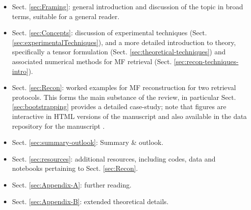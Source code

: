 \begin{itemize}
\item Sect. \ref{sec:Framing}: general introduction and discussion of the topic in broad terms, suitable for a general reader.
\item Sect. \ref{sec:Concepts}: discussion of experimental techniques (Sect. \ref{sec:experimentalTechniques}), and a more detailed introduction to theory, specifically a tensor formulation  (Sect. \ref{sec:theoretical-techniques}) and associated numerical methods for MF retrieval (Sect. \ref{sec:recon-techniques-intro}).
\item Sect. \ref{sec:Recon}: worked examples for MF reconstruction for two retrieval protocols. This forms the main substance of the review, in particular Sect. \ref{sec:bootstrapping} provides a detailed case-study; note that figures are interactive in HTML versions of the manuscript and also available in the data repository for the manuscript \cite{hockett2022MFreconFigshare}.
\item Sect. \ref{sec:summary-outlook}: Summary \& outlook.
\item Sect. \ref{sec:resources}: additional resources, including codes, data and notebooks pertaining to Sect. \ref{sec:Recon}.
\item Sect. \ref{sec:Appendix-A}: further reading.
\item Sect. \ref{sec:Appendix-B}: extended theoretical details.
\end{itemize}



